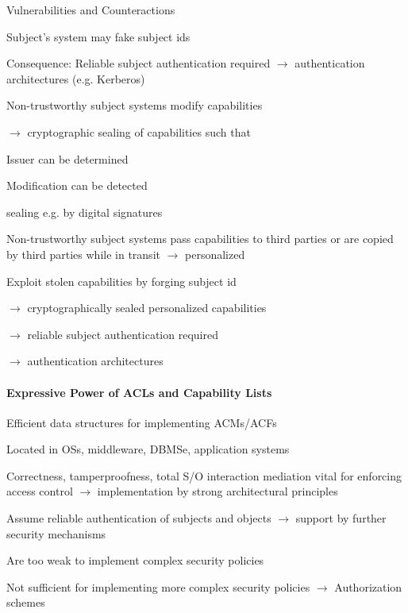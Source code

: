 \documentclass[a4paper]{article}
\begin{document}
\begin{multicols}{3}
    Vulnerabilities and Counteractions
    \begin{itemize*}
        \item Subject’s system may fake subject ids
        \item Consequence: Reliable subject authentication required $\rightarrow$ authentication architectures (e.g. Kerberos)
        \item Non-trustworthy subject systems modify capabilities
        \begin{itemize*}
            \item[$\rightarrow$] cryptographic sealing of capabilities such that
            \item Issuer can be determined
            \item Modification can be detected
            \item sealing e.g. by digital signatures
        \end{itemize*}
        \item Non-trustworthy subject systems pass capabilities to third parties or are copied by third parties while in transit $\rightarrow$ personalized
        \item Exploit stolen capabilities by forging subject id
        \begin{itemize*}
            \item[$\rightarrow$] cryptographically sealed personalized capabilities
            \item[$\rightarrow$] reliable subject authentication required
            \item[$\rightarrow$] authentication architectures
        \end{itemize*}
    \end{itemize*}

    \paragraph{Expressive Power of ACLs and Capability Lists}
    \begin{itemize*}
        \item Efficient data structures for implementing ACMs/ACFs
        \item Located in OSs, middleware, DBMSe, application systems
        \item Correctness, tamperproofness, total S/O interaction mediation vital for enforcing access control $\rightarrow$ implementation by strong architectural principles
        \item Assume reliable authentication of subjects and objects $\rightarrow$ support by further security mechanisms
        \item Are too weak to implement complex security policies
        \item Not sufficient for implementing more complex security policies $\rightarrow$ Authorization schemes
    \end{itemize*}


\end{multicols}
\end{document}
